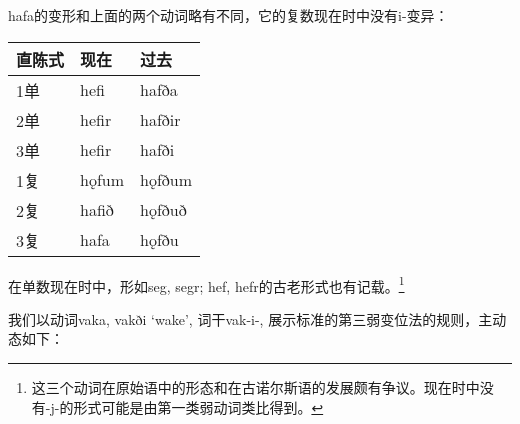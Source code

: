hafa的变形和上面的两个动词略有不同，它的复数现在时中没有i-变异：

\begin{longtable}{lll}
  \toprule
  直陈式 & 现在  & 过去   \\
  \midrule
  \endhead
  \bottomrule
  \endfoot
  1单    & hefi  & hafða  \\
  2单    & hefir & hafðir \\
  3单    & hefir & hafði  \\
  1复    & hǫfum & hǫfðum \\
  2复    & hafið & hǫfðuð \\
  3复    & hafa  & hǫfðu  \\
\end{longtable}

在单数现在时中，形如seg, segr; hef, hefr的古老形式也有记载。\footnote{这三个动词在原始语中的形态和在古诺尔斯语的发展颇有争议。现在时中没有-j-的形式可能是由第一类弱动词类比得到。}

我们以动词vaka, vakði `wake‌', 词干vak-i-,
展示标准的第三弱变位法的规则，主动态如下：


